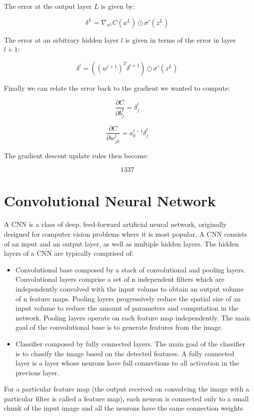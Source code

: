 The error at the output layer $L$ is given by:

$$
\delta^L = \nabla_{a^L} C(a^L) \odot \sigma'(z^L)
$$

The error at an arbitrary hidden layer $l$ is given in terms of the error in layer $l+1$:

$$
\delta^l = ((w^{l+1})^T \delta^{l+1}) \odot \sigma'(z^L)
$$

Finally we can relate the error back to the gradient we wanted to compute:

$$
\frac{\partial C}{\partial b^l_j} = \delta^l_j
$$

$$
\frac{\partial C}{\partial w^l_{jk}} = a^{l-1}_k \delta^l_j
$$

The gradient descent update rules then become:

$$
1337
$$

\section{Convolutional Neural Network}

A \ac{CNN} is a class of deep, feed-forward artificial neural network, originally designed for computer vision problems where it is most popular. A \ac{CNN} consists of an input and an output layer, as well as multiple hidden layers. The hidden layers of a \ac{CNN} are typically comprised of:

\begin{itemize}
    \item Convolutional base composed by a stack of convolutional and pooling layers. Convolutional layers comprise a set of n independent filters which are independently convolved with the input volume to obtain an output volume of n feature maps. Pooling layers progressively reduce the spatial size of an input volume to reduce the amount of parameters and computation in the network. Pooling layers operate on each feature map independently. The main goal of the convolutional base is to generate features from the image.
    \item Classifier composed by fully connected layers. The main goal of the classifier is to classify the image based on the detected features. A fully connected layer is a layer whose neurons have full connections to all activation in the previous layer.
\end{itemize}

For a particular feature map (the output received on convolving the image with a particular filter is called a feature map), each neuron is connected only to a small chunk of the input image and all the neurons have the same connection weights

